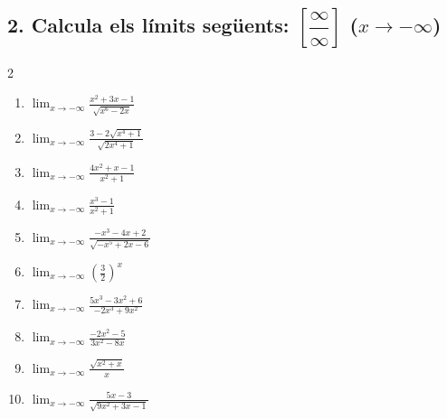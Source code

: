 \documentclass[12pt,a4paper]{article}
\begin{document}
\subsection*{2. Calcula els límits següents: $\left[\dfrac{\infty}{\infty}\right]$ \quad ($x \to -\infty$)}
\begin{multicols}{2}
\begin{enumerate}[label=2.\arabic*.]
    \item $\displaystyle \lim_{x \to -\infty} \frac{x^2+3x-1}{\sqrt{x^6-2x}}$
    \item $\displaystyle \lim_{x \to -\infty} \frac{3-2\sqrt{x^4+1}}{\sqrt{2x^4+1}}$
    \item $\displaystyle \lim_{x \to -\infty} \frac{4x^2+x-1}{x^2+1}$
    \item $\displaystyle \lim_{x \to -\infty} \frac{x^3-1}{x^2+1}$
    \item $\displaystyle \lim_{x \to -\infty} \frac{-x^3-4x+2}{\sqrt{-x^5+2x-6}}$
    \item $\displaystyle \lim_{x \to -\infty} \left( \frac{3}{2} \right)^{\!x}$
    \item $\displaystyle \lim_{x \to -\infty} \frac{5x^3-3x^2+6}{-2x^3+9x^2}$
    \item $\displaystyle \lim_{x \to -\infty} \frac{-2x^2-5}{3x^2-8x}$
    \item $\displaystyle \lim_{x \to -\infty} \frac{\sqrt{x^2+x}}{x}$
    \item $\displaystyle \lim_{x \to -\infty} \frac{5x-3}{\sqrt{9x^2+3x-1}}$
\end{enumerate}
\end{multicols}

\end{document}

